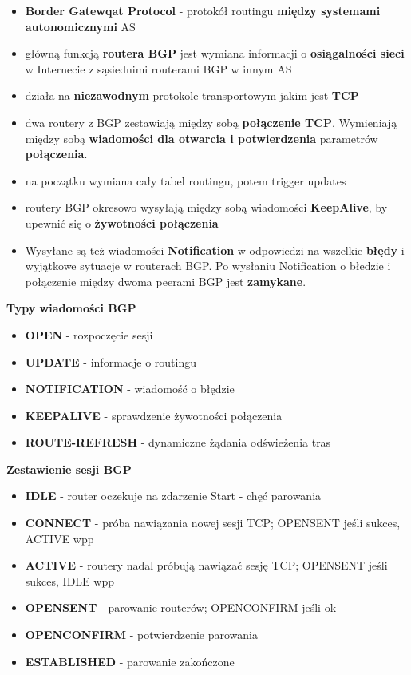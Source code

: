 \documentclass[../main.tex]{subfiles}
\begin{document}
    \begin{itemize}
        \item \textbf{Border Gatewqat Protocol} -  protokół routingu \textbf{między systemami autonomicznymi} AS
        \item główną funkcją \textbf{routera BGP} jest wymiana informacji o \textbf{osiągalności sieci} w Internecie z sąsiednimi routerami BGP w innym AS
        \item działa na \textbf{niezawodnym} protokole transportowym jakim jest \textbf{TCP}
        \item dwa routery z BGP zestawiają między sobą \textbf{połączenie TCP}. Wymieniają między sobą \textbf{wiadomości dla otwarcia i potwierdzenia} parametrów \textbf{połączenia}.
        \item na początku wymiana cały tabel routingu, potem trigger updates
        \item routery BGP okresowo wysyłają między sobą wiadomości \textbf{KeepAlive}, by upewnić się o \textbf{żywotności połączenia}
        \item Wysyłane są też wiadomości \textbf{Notification} w odpowiedzi na wszelkie \textbf{błędy} i wyjątkowe sytuacje w routerach BGP. Po wysłaniu Notification o błedzie i połączenie między dwoma peerami BGP jest \textbf{zamykane}.
    \end{itemize}

    \textbf{Typy wiadomości BGP}
    \begin{itemize}
        \item \textbf{OPEN} - rozpoczęcie sesji
        \item \textbf{UPDATE} - informacje o routingu
        \item \textbf{NOTIFICATION} - wiadomość o błędzie
        \item \textbf{KEEPALIVE} - sprawdzenie żywotności połączenia
        \item \textbf{ROUTE-REFRESH} - dynamiczne żądania odświeżenia tras
    \end{itemize}

    \textbf{Zestawienie sesji BGP}
    \begin{itemize}
        \item \textbf{IDLE} - router oczekuje na zdarzenie Start - chęć parowania
        \item \textbf{CONNECT} - próba nawiązania nowej sesji TCP; OPENSENT jeśli sukces, ACTIVE wpp
        \item \textbf{ACTIVE} - routery nadal próbują nawiązać sesję TCP; OPENSENT jeśli sukces, IDLE wpp
        \item \textbf{OPENSENT} - parowanie routerów; OPENCONFIRM jeśli ok
        \item \textbf{OPENCONFIRM} - potwierdzenie parowania
        \item \textbf{ESTABLISHED} - parowanie zakończone
    \end{itemize}
\end{document}
